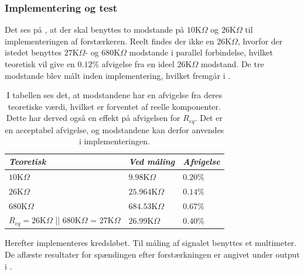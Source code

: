 \subsubsection{Implementering og test}
Det ses på , at der skal benyttes to modstande på $10$K$\Omega$ og $26$K$\Omega$ til implementeringen af forstærkeren. Reelt findes der ikke en $26$K$\Omega$, hvorfor der istedet benyttes $27$K$\Omega$- og $680$K$\Omega$ modstande i parallel forbindelse, hvilket teoretisk vil give en $0.12$\% afvigelse fra en ideel $26$K$\Omega$ modstand. De tre modstande blev målt inden implementering, hvilket fremgår i .
\begin{table}[H]
	\centering
	\begin{tabular}{|l|l|l|}
		\hline
		\textit{Teoretisk}  & \textit{Ved måling} & \textit{Afvigelse} \\ \hline
		$10$K$\Omega$       & $9.98$K$\Omega$     & $0.20$\%               \\ \hline
		$26$K$\Omega$      &  $25.964$K$\Omega$   & $0.14$\% \\ \hline
		$680$K$\Omega$      & $684.53$K$\Omega$   & $0.67$\%               \\ \hline
$R_{eq} = 26$K$\Omega$ || $680$K$\Omega$ = $27$K$\Omega$       & $26.99$K$\Omega$    & $0.40$\%               \\ \hline
	\end{tabular}
	\caption{I tabellen ses det, at modstandene har en afvigelse fra deres teoretiske værdi, hvilket er forventet af reelle komponenter. Dette har derved også en effekt på afvigelsen for $R_{eq}$. Det er en acceptabel afvigelse, og modstandene kan derfor anvendes i implementeringen.}
	\label{Tab:modstand_faktor3}
\end{table}
\noindent Herefter implementeres kredsløbet. Til måling af signalet benyttes et multimeter. De aflæste resultater for spændingen efter forstærkningen er angivet under output i .\
